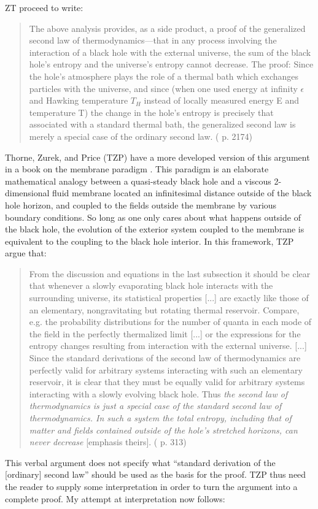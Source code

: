 \documentclass[12pt]{article}
\begin{document}
ZT proceed to write:
\begin{quote}\small
The above analysis provides, as a side product, a proof of the generalized second law of thermodynamics---that in any process involving the interaction of a black hole with the external universe, the sum of the black hole's entropy and the universe's entropy cannot decrease.  The proof: Since the hole's atmosphere plays the role of a thermal bath which exchanges particles with the universe, and since (when one used energy at infinity $\epsilon$ and Hawking temperature $T_{H}$ instead of locally measured energy E and temperature T) the change in the hole's entropy is precisely that associated with a standard thermal bath, the generalized second law is merely a special case of the ordinary second law.  (\cite{ZT85} p. 2174)
\end{quote}
Thorne, Zurek, and Price (TZP) have a more developed version of this argument in a book on the membrane paradigm \cite{TZP86}.  This paradigm is an elaborate mathematical analogy between a quasi-steady black hole and a viscous 2-dimensional fluid membrane located an infinitesimal distance outside of the black hole horizon, and coupled to the fields outside the membrane by various boundary conditions.  So long as one only cares about what happens outside of the black hole, the evolution of the exterior system coupled to the membrane is equivalent to the coupling to the black hole interior.  In this framework, TZP argue that:
\begin{quote}\small
From the discussion and equations in the last subsection it should be clear that whenever a slowly evaporating black hole interacts with the surrounding universe, its statistical properties [...] are exactly like those of an elementary, nongravitating but rotating thermal reservoir.  Compare, e.g. the probability distributions for the number of quanta in each mode of the field in the perfectly thermalized limit [...] or the expressions for the entropy changes resulting from interaction with the external universe. [...] Since the standard derivations of the second law of thermodynamics are perfectly valid for arbitrary systems interacting with such an elementary reservoir, it is clear that they must be equally valid for arbitrary systems interacting with a slowly evolving black hole.  Thus \emph{the second law of thermodynamics is just a special case of the standard second law of thermodynamics.  In such a system the total entropy, including that of matter and fields contained outside of the hole's stretched horizons, can never decrease} [emphasis theirs].  (\cite{TZP86} p. 313)
\end{quote}
This verbal argument does not specify what ``standard derivation of the [ordinary] second law'' should be used as the basis for the proof.  TZP thus need the reader to supply some interpretation in order to turn the argument into a complete proof.  My attempt at interpretation now follows:
\end{document}
